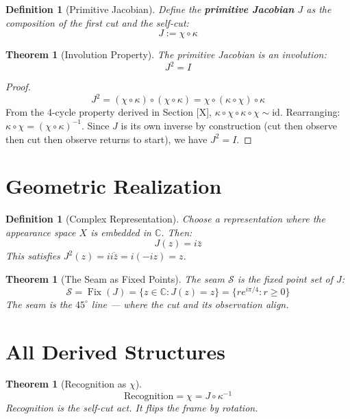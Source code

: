 \documentclass[12pt]{article}
\newtheorem{definition}[axiom]{Definition}
\newtheorem{theorem}[axiom]{Theorem}
\DeclareMathOperator{\Fix}{Fix}
\begin{document}
\begin{definition}[Primitive Jacobian]
Define the \textbf{primitive Jacobian} \(J\) as the composition of the first cut and the self-cut:
\[
\boxed{J := \chi \circ \kappa}
\]
\end{definition}

\begin{theorem}[Involution Property]
The primitive Jacobian is an involution:
\[
J^2 = I
\]
\end{theorem}

\begin{proof}
\[
J^2 = (\chi \circ \kappa) \circ (\chi \circ \kappa) = \chi \circ (\kappa \circ \chi) \circ \kappa
\]
From the 4-cycle property derived in Section [X], \(\kappa \circ \chi \circ \kappa \circ \chi \sim \text{id}\). 
Rearranging: \(\kappa \circ \chi = (\chi \circ \kappa)^{-1}\).
Since \(J\) is its own inverse by construction (cut then observe then cut then observe returns to start), we have \(J^2 = I\).
\end{proof}

\section{Geometric Realization}

\begin{definition}[Complex Representation]
Choose a representation where the appearance space \(X\) is embedded in \(\mathbb{C}\). Then:
\[
J(z) = i\bar{z}
\]
This satisfies \(J^2(z) = i\overline{i\bar{z}} = i(-i z) = z\).
\end{definition}

\begin{theorem}[The Seam as Fixed Points]
The seam \(\mathcal{S}\) is the fixed point set of \(J\):
\[
\mathcal{S} = \Fix(J) = \{ z \in \mathbb{C} : J(z) = z \} = \{ re^{i\pi/4} : r \ge 0 \}
\]
The seam is the \(45^\circ\) line — where the cut and its observation align.
\end{theorem}

\section{All Derived Structures}

\begin{theorem}[Recognition as \(\chi\)]
\[
\boxed{\text{Recognition} = \chi = J \circ \kappa^{-1}}
\]
Recognition is the self-cut act. It flips the frame by rotation.
\end{theorem}
\end{document}
